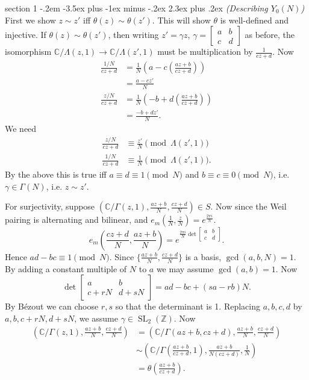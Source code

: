 \documentclass[12pt]{article}
\makeatletter
\theoremstyle{norm}
\newcommand{\C}[0]{\mathbb{C}}
\newcommand{\Z}[0]{\mathbb{Z}}
\newcommand{\rc}[1]{\frac{1}{#1}}
\newcommand{\ga}[0]{\gamma}
\newcommand{\Ga}[0]{\Gamma}
\newcommand{\La}[0]{\Lambda}
\newcommand{\pa}[1]{\left( {#1} \right)}
\newcommand{\SL}{\operatorname{SL}}
\newcommand{\pf}[2]{\pa{\frac{#1}{#2}}}
\newcommand{\matt}[4]{
\left[
\begin{matrix}
{#1}&{#2}\\
{#3}&{#4}
\end{matrix}
\right]}
\newcommand{\smatt}[4]{
\left[
\begin{smallmatrix}
{#1}&{#2}\\
{#3}&{#4}
\end{smallmatrix}
\right]}
\newenvironment{problem}{\@startsection
       {section}
       {1}
       {-.2em}
       {-3.5ex plus -1ex minus -.2ex}
       {2.3ex plus .2ex}
       {\pagebreak[3]%
       \large\bf\noindent{Problem }
       }
       }
       {%
       }
\makeatother
\begin{document}
\begin{problem}{\it (Describing $Y_0(N)$)}
First we show $z\sim z'$ iff $\theta(z)\sim \theta(z')$. This will show $\theta$ is well-defined and injective. If $\theta(z)\sim \theta(z')$, then writing $z'=\ga z$, $\ga=\smatt abcd$ as before, the isomorphism $\C/\La(z,1)\to \C/\La(z',1)$ must be multiplication by $\rc{cz+d}$. 
Now
\begin{align*}
\frac{1/N}{cz+d}&=\rc{N}\pa{a-c\pf{az+b}{cz+d}}\\
&=\frac{a-cz'}{N}\\
\frac{z/N}{cz+d}&=\rc{N}\pa{-b+d\pf{az+b}{cz+d}}\\
&=\frac{-b+dz'}{N}.
\end{align*}
We need 
\begin{align*}
\frac{z/N}{cz+d}&\equiv \frac{z'}{N}\pmod{\La(z',1)}\\
\frac{1/N}{cz+d}&\equiv \frac{1}{N}\pmod{\La(z',1)}.
\end{align*}
By the above this is true iff $a\equiv d\equiv 1\pmod N$ and $b\equiv c\equiv 0\pmod N$, i.e. $\ga\in \Ga(N)$, i.e. $z\sim z'$.

For surjectivity, suppose $(\C/\Ga(z,1), \frac{az+b}{N},\frac{cz+d}{N})\in S$. Now since the Weil pairing is alternating and bilinear, and $e_m(\rc{N},\frac{z}{N})=e^{\frac{2\pi i}{N}}$. 
\[
e_m\pa{
\frac{cz+d}{N}
,\frac{az+b}{N}}=e^{\frac{2\pi i}{N}\det\smatt abcd}.
\]
Hence $ad-bc\equiv 1\pmod N$. Since $\{\frac{az+b}{N},\frac{cz+d}{N}\}$ is a basis, $\gcd(a,b,N)=1$. By adding a constant multiple of $N$ to $a$ we may assume $\gcd(a,b)=1$. Now
\[
\det\matt  ab{c+rN}{d+sN}=ad-bc+(sa-rb)N.
\]
By B\'ezout we can choose $r,s$ so that the determinant is 1. Replacing $a,b,c,d$ by $a,b,c+rN, d+sN$, we assume $\ga\in \SL_2(\Z)$. Now
\begin{align*}
\pa{\C/\Ga(z,1), \frac{az+b}{N},\frac{cz+d}{N}}&= 
\pa{\C/\Ga\pa{az+b,cz+d},\frac{az+b}{N},\frac{cz+d}{N}}\\
&\sim \pa{\C/\Ga\pa{\frac{az+b}{cz+d},1},\frac{az+b}{N(cz+d)},\frac{1}{N}}\\
&=\theta\pa{\frac{az+b}{cz+d}}.
\end{align*}

\end{problem}
\end{document}
